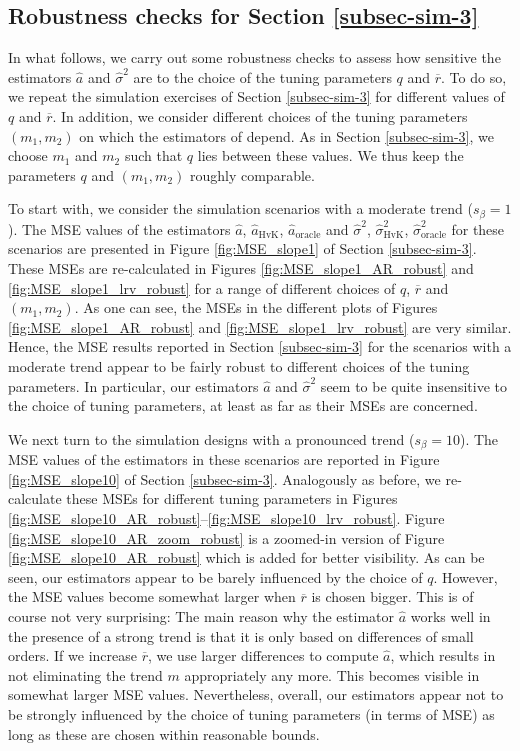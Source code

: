 \subsection*{Robustness checks for Section \ref{subsec-sim-3}}


In what follows, we carry out some robustness checks to assess how sensitive the estimators $\widehat{a}$ and $\widehat{\sigma}^2$ are to the choice of the tuning parameters $q$ and $\overline{r}$. To do so, we repeat the simulation exercises of Section \ref{subsec-sim-3} for different values of $q$ and $\overline{r}$. In addition, we consider different choices of the tuning parameters $(m_1,m_2)$ on which the estimators of \cite{Hall2003} depend. As in Section \ref{subsec-sim-3}, we choose $m_1$ and $m_2$ such that $q$ lies between these values. We thus keep the parameters $q$ and $(m_1,m_2)$ roughly comparable. 


To start with, we consider the simulation scenarios with a moderate trend ($s_\beta = 1$). The MSE values of the estimators $\widehat{a}$, $\widehat{a}_{\text{HvK}}$, $\widehat{a}_{\text{oracle}}$ and $\widehat{\sigma}^2$, $\widehat{\sigma}^2_{\text{HvK}}$, $\widehat{\sigma}^2_{\text{oracle}}$ for these scenarios are presented in Figure \ref{fig:MSE_slope1} of Section \ref{subsec-sim-3}. These MSEs are re-calculated in Figures \ref{fig:MSE_slope1_AR_robust} and \ref{fig:MSE_slope1_lrv_robust} for a range of different choices of $q$, $\overline{r}$ and $(m_1,m_2)$. As one can see, the MSEs in the different plots of Figures \ref{fig:MSE_slope1_AR_robust} and \ref{fig:MSE_slope1_lrv_robust} are very similar. Hence, the MSE results reported in Section \ref{subsec-sim-3} for the scenarios with a moderate trend appear to be fairly robust to different choices of the tuning parameters. In particular, our estimators $\widehat{a}$ and $\widehat{\sigma}^2$ seem to be quite insensitive to the choice of tuning parameters, at least as far as their MSEs are concerned.


We next turn to the simulation designs with a pronounced trend ($s_\beta = 10$). The MSE values of the estimators in these scenarios are reported in Figure \ref{fig:MSE_slope10} of Section \ref{subsec-sim-3}. Analogously as before, we re-calculate these MSEs for different tuning parameters in Figures \ref{fig:MSE_slope10_AR_robust}--\ref{fig:MSE_slope10_lrv_robust}. Figure \ref{fig:MSE_slope10_AR_zoom_robust} is a zoomed-in version of Figure \ref{fig:MSE_slope10_AR_robust} which is added for better visibility. As can be seen, our estimators appear to be barely influenced by the choice of $q$. However, the MSE values become somewhat larger when $\overline{r}$ is chosen bigger. This is of course not very surprising: The main reason why the estimator $\widehat{a}$ works well in the presence of a strong trend is that it is only based on differences of small orders. If we increase $\overline{r}$, we use larger differences to compute $\widehat{a}$, which results in not eliminating the trend $m$ appropriately any more. This becomes visible in somewhat larger MSE values. Nevertheless, overall, our estimators appear not to be strongly influenced by the choice of tuning parameters (in terms of MSE) as long as these are chosen within reasonable bounds. 



